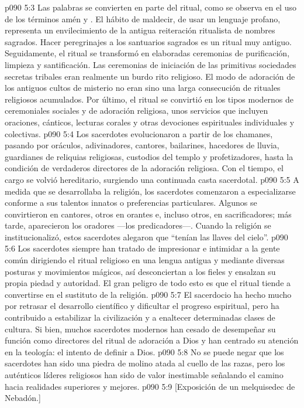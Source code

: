 \vs p090 5:3 Las palabras se convierten en parte del ritual, como se observa en el uso de los términos amén y . El hábito de maldecir, de usar un lenguaje profano, representa un envilecimiento de la antigua reiteración ritualista de nombres sagrados. Hacer peregrinajes a los santuarios sagrados es un ritual muy antiguo. Seguidamente, el ritual se transformó en elaboradas ceremonias de purificación, limpieza y santificación. Las ceremonias de iniciación de las primitivas sociedades secretas tribales eran realmente un burdo rito religioso. El modo de adoración de los antiguos cultos de misterio no eran sino una larga consecución de rituales religiosos acumulados. Por último, el ritual se convirtió en los tipos modernos de ceremoniales sociales y de adoración religiosa, unos servicios que incluyen oraciones, cánticos, lecturas corales y otras devociones espirituales individuales y colectivas.
\vs p090 5:4 \pc Los sacerdotes evolucionaron a partir de los chamanes, pasando por oráculos, adivinadores, cantores, bailarines, hacedores de lluvia, guardianes de reliquias religiosas, custodios del templo y profetizadores, hasta la condición de verdaderos directores de la adoración religiosa. Con el tiempo, el cargo se volvió hereditario, surgiendo una continuada casta sacerdotal.
\vs p090 5:5 A medida que se desarrollaba la religión, los sacerdotes comenzaron a especializarse conforme a sus talentos innatos o preferencias particulares. Algunos se convirtieron en cantores, otros en orantes e, incluso otros, en sacrificadores; más tarde, aparecieron los oradores ---los predicadores---. Cuando la religión se institucionalizó, estos sacerdotes alegaron que “tenían las llaves del cielo”.
\vs p090 5:6 Los sacerdotes siempre han tratado de impresionar e intimidar a la gente común dirigiendo el ritual religioso en una lengua antigua y mediante diversas posturas y movimientos mágicos, así desconciertan a los fieles y ensalzan su propia piedad y autoridad. El gran peligro de todo esto es que el ritual tiende a convertirse en el sustituto de la religión.
\vs p090 5:7 El sacerdocio ha hecho mucho por retrasar el desarrollo científico y dificultar el progreso espiritual, pero ha contribuido a estabilizar la civilización y a enaltecer determinadas clases de cultura. Si bien, muchos sacerdotes modernos han cesado de desempeñar su función como directores del ritual de adoración a Dios y han centrado su atención en la teología: el intento de definir a Dios.
\vs p090 5:8 No se puede negar que los sacerdotes han sido una piedra de molino atada al cuello de las razas, pero los auténticos líderes religiosos han sido de valor inestimable señalando el camino hacia realidades superiores y mejores.
\vsetoff
\vs p090 5:9 [Exposición de un melquisedec de Nebadón.]
